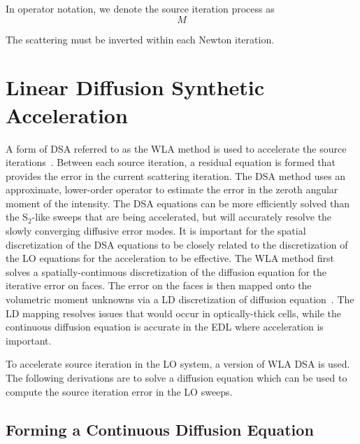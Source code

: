 In operator notation, we denote the source iteration process as
\begin{equation}
    M 
\end{equation}

The scattering must be inverted within each Newton iteration.

\section{Linear Diffusion Synthetic Acceleration}

A form of DSA referred to as the WLA method is used to accelerate the source iterations~\cite{wla}. 
Between each source iteration, a residual equation is formed that provides 
the error in the current scattering iteration. The DSA method uses an approximate,
lower-order operator to estimate the error in the zeroth angular moment of the
intensity.  The DSA equations can be more efficiently
solved than the S$_2$-like sweeps that are being accelerated, but will accurately resolve the
slowly converging diffusive error modes.  It is important for the spatial discretization of the DSA
equations to be closely related to the discretization of the LO equations for the
acceleration to be effective.  The WLA method first solves a spatially-continuous
discretization of the diffusion equation
for the iterative error on faces.  The error on the faces is then mapped onto the
volumetric moment unknowns via a LD discretization of diffusion equation~\cite{wla}.
The LD mapping resolves issues that would occur in optically-thick cells, while the
continuous diffusion equation is accurate in the EDL where acceleration is important.

To accelerate source iteration in the LO system, a version of WLA DSA is used.  The
following derivations are to solve a diffusion equation which can be used to compute
the source iteration error in the LO sweeps.

\subsection{Forming a Continuous Diffusion Equation}

